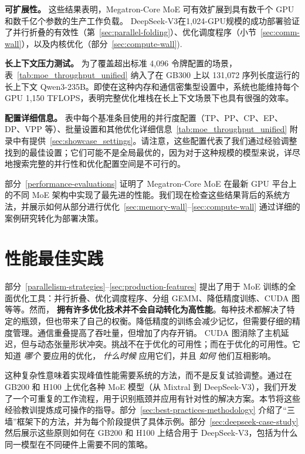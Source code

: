 \documentclass[10pt,logo,copyright]{nvidiatechreport_zh}
\begin{document}
\textbf{可扩展性。}
这些结果表明，Megatron-Core MoE 可有效扩展到具有数千个 GPU 和数千亿个参数的生产工作负载。 DeepSeek-V3在1,024-GPU规模的成功部署验证了并行折叠的有效性（第~\ref{sec:parallel-folding}）、优化调度程序（小节~\ref{sec:comm-wall}），以及内核优化（部分~\ref{sec:compute-wall}).

\textbf{长上下文压力测试。}
为了覆盖超出标准 4{,}096 令牌配置的场景，表~\ref{tab:moe_throughput_unified} 纳入了在 GB300 上以 131{,}072 序列长度运行的长上下文 Qwen3-235B。即使在这种内存和通信密集型设置中，系统也能维持每个 GPU 1{,}150 TFLOPS，表明完整优化堆栈在长上下文场景下也具有很强的效率。

\noindent
\textbf{配置详细信息。} 表中每个基准条目使用的并行度配置（TP、PP、CP、EP、DP、VPP 等）、批量设置和其他优化详细信息~\ref{tab:moe_throughput_unified} 附录中有提供~\ref{sec:showcase_settings}。请注意，这些配置代表了我们通过经验调整找到的最佳设置；它们可能不是全局最优的，因为对于这种规模的模型来说，详尽地搜索完整的并行性和优化配置空间是不可行的。

部分~\ref{performance-evaluations} 证明了 Megatron-Core MoE 在最新 GPU 平台上的不同 MoE 架构中实现了最先进的性能。我们现在检查这些结果背后的系统方法，并展示如何从部分进行优化~\ref{sec:memory-wall}--\ref{sec:compute-wall} 通过详细的案例研究转化为部署决策。

\section{性能最佳实践}\label{sec:best-practices}

部分~\ref{parallelism-strategies}--\ref{sec:production-features} 提出了用于 MoE 训练的全面优化工具：并行折叠、优化调度程序、分组 GEMM、降低精度训练、CUDA 图等等。然而， \textbf{拥有许多优化技术并不会自动转化为高性能}。每种技术都解决了特定的瓶颈，但也带来了自己的权衡。降低精度的训练会减少记忆，但需要仔细的精度管理。通信重叠提高了吞吐量，但增加了内存开销。 CUDA 图消除了主机延迟，但与动态张量形状冲突。挑战不在于优化的可用性；而在于优化的可用性。它知道 \emph{哪个} 要应用的优化， \emph{什么时候} 应用它们，并且 \emph{如何} 他们互相影响。

这种复杂性意味着实现峰值性能需要系统的方法，而不是反复试验调整。通过在 GB200 和 H100 上优化各种 MoE 模型（从 Mixtral 到 DeepSeek-V3），我们开发了一个可重复的工作流程，用于识别瓶颈并应用有针对性的解决方案。本节将这些经验教训提炼成可操作的指导。部分~\ref{sec:best-practices-methodology} 介绍了“三墙”框架下的方法，并为每个阶段提供了具体示例。部分~\ref{sec:deepseek-case-study} 然后展示这些原则如何在 GB200 和 H100 上结合用于 DeepSeek-V3，包括为什么同一模型在不同硬件上需要不同的策略。
\end{document}
